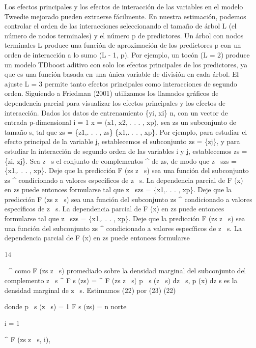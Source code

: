 \documentclass[]{article}
\begin{document}
Los efectos principales y los efectos de interacción de las variables en
el modelo Tweedie mejorado pueden extraerse fácilmente. En nuestra
estimación, podemos controlar el orden de las interacciones
seleccionando el tamaño de árbol L (el número de nodos terminales) y el
número p de predictores. Un árbol con nodos terminales L produce una
función de aproximación de los predictores p con un orden de interacción
a lo sumo (L - 1, p). Por ejemplo, un tocón (L = 2) produce un modelo
TDboost aditivo con solo los efectos principales de los predictores, ya
que es una función basada en una única variable de división en cada
árbol. El ajuste L = 3 permite tanto efectos principales como
interacciones de segundo orden. Siguiendo a Friedman (2001) utilizamos
los llamados gráficos de dependencia parcial para visualizar los efectos
principales y los efectos de interacción. Dados los datos de
entrenamiento \{yi, xi\} n, con un vector de entrada p-dimensional i = 1
x = (x1, x2, . . . , xp), sea zs un subconjunto de tamaño s, tal que zs
= \{z1,. . . , zs\} \{x1,. . . , xp\}. Por ejemplo, para estudiar el
efecto principal de la variable j, establecemos el subconjunto zs =
\{zj\}, y para estudiar la interacción de segundo orden de las variables
i y j, establecemos zs = \{zi, zj\}. Sea z ~s el conjunto de
complementos \^{} de zs, de modo que z ~szs = \{x1,. . . , xp\}. Deje
que la predicción F (zs \textbar{} z ~s) sea una función del subconjunto
zs \^{} condicionado a valores específicos de z ~s. La dependencia
parcial de F (x) en zs puede entonces formularse tal que z ~szs = \{x1,.
. . , xp\}. Deje que la predicción F (zs \textbar{} z ~s) sea una
función del subconjunto zs \^{} condicionado a valores específicos de z
~s. La dependencia parcial de F (x) en zs puede entonces formularse tal
que z ~szs = \{x1,. . . , xp\}. Deje que la predicción F (zs \textbar{}
z ~s) sea una función del subconjunto zs \^{} condicionado a valores
específicos de z ~s. La dependencia parcial de F (x) en zs puede
entonces formularse

14

 \^{} como F (zs \textbar{} z ~s) promediado sobre la densidad marginal
del subconjunto del complemento z ~s \^{} F s (zs) = \^{} F (zs
\textbar{} z ~s) p ~s (z ~s) dz ~s, p (x) dz s es la densidad marginal
de z ~s. Estimamos (22) por (23) (22)

donde p ~s (z ~s) = 1 F s (zs) = n norte

i = 1

\^{} F (zs \textbar{} z ~s, i),
\end{document}
